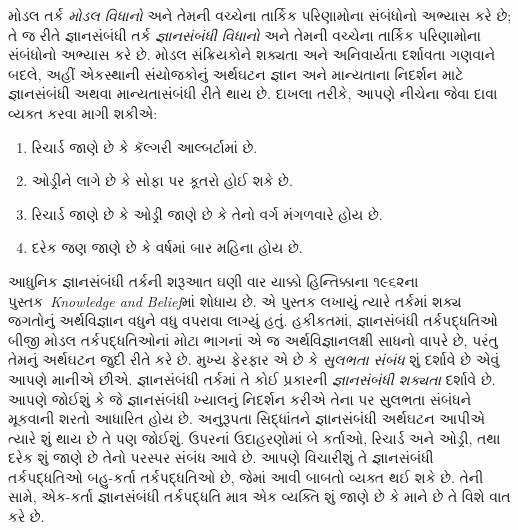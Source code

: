 \begingroup
\makeatletter{}\makeatother


\label{guunit:OLP-0483}


મોડલ તર્ક \emph{મોડલ વિધાનો} અને તેમની વચ્ચેના તાર્કિક પરિણામોના
સંબંધોનો અભ્યાસ કરે છે; તે જ રીતે જ્ઞાનસંબંધી તર્ક
\emph{જ્ઞાનસંબંધી વિધાનો} અને તેમની વચ્ચેના તાર્કિક પરિણામોના
સંબંધોનો અભ્યાસ કરે છે. મોડલ સંક્રિયકોને શક્યતા અને અનિવાર્યતા
દર્શાવતા ગણવાને બદલે, અહીં એકસ્થાની સંયોજકોનું અર્થઘટન જ્ઞાન અને
માન્યતાના નિદર્શન માટે જ્ઞાનસંબંધી અથવા માન્યતાસંબંધી રીતે થાય છે.
દાખલા તરીકે, આપણે નીચેના જેવા દાવા વ્યક્ત કરવા માગી શકીએ:

\begin{enumerate}
\item રિચાર્ડ જાણે છે કે કૅલ્ગરી આલ્બર્ટામાં છે.
\item ઓડ્રીને લાગે છે કે સોફા પર કૂતરો હોઈ શકે છે.
\item રિચાર્ડ જાણે છે કે ઓડ્રી જાણે છે કે તેનો વર્ગ મંગળવારે હોય છે.
\item દરેક જણ જાણે છે કે વર્ષમાં બાર મહિના હોય છે.
\end{enumerate}
આધુનિક જ્ઞાનસંબંધી તર્કની શરૂઆત ઘણી વાર યાક્કો હિન્તિક્કાના
૧૯૬૨ના પુસ્તક~\emph{Knowledge and Belief}માં શોધાય છે. એ પુસ્તક
લખાયું ત્યારે તર્કમાં શક્ય જગતોનું અર્થવિજ્ઞાન વધુને વધુ વપરાવા
લાગ્યું હતું. હકીકતમાં, જ્ઞાનસંબંધી તર્કપદ્ધતિઓ બીજી મોડલ
તર્કપદ્ધતિઓનાં મોટા ભાગનાં એ જ અર્થવિજ્ઞાનલક્ષી સાધનો વાપરે છે,
પરંતુ તેમનું અર્થઘટન જુદી રીતે કરે છે. મુખ્ય ફેરફાર એ છે કે
\emph{સુલભતા સંબંધ} શું દર્શાવે છે એવું આપણે માનીએ છીએ.
જ્ઞાનસંબંધી તર્કમાં તે કોઈ પ્રકારની \emph{જ્ઞાનસંબંધી શક્યતા}
દર્શાવે છે. આપણે જોઈશું કે જે જ્ઞાનસંબંધી ખ્યાલનું નિદર્શન કરીએ
તેના પર સુલભતા સંબંધને મૂકવાની શરતો આધારિત હોય છે. અનુરૂપતા
સિદ્ધાંતને જ્ઞાનસંબંધી અર્થઘટન આપીએ ત્યારે શું થાય છે તે પણ
જોઈશું. ઉપરનાં ઉદાહરણોમાં બે કર્તાઓ, રિચાર્ડ અને ઓડ્રી, તથા
દરેક શું જાણે છે તેનો પરસ્પર સંબંધ આવે છે. આપણે વિચારીશું તે
જ્ઞાનસંબંધી તર્કપદ્ધતિઓ બહુ-કર્તા તર્કપદ્ધતિઓ છે, જેમાં આવી બાબતો
વ્યક્ત થઈ શકે છે. તેની સામે, એક-કર્તા જ્ઞાનસંબંધી તર્કપદ્ધતિ
માત્ર એક વ્યક્તિ શું જાણે છે કે માને છે તે વિશે વાત કરે છે.
\endgroup

\begingroup
\makeatletter{}\makeatother


